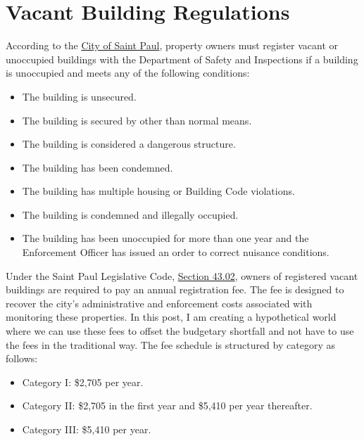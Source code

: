 \documentclass[12pt]{article}
\begin{document}
\section*{Vacant Building Regulations}

According to the \href{https://www.stpaul.gov/departments/safety-inspections/rent-buy-sell-property/vacant-buildings/vacant-building-program}{City of Saint Paul}, property owners must register vacant or unoccupied buildings with the Department of Safety and Inspections if a building is unoccupied and meets any of the following conditions:

\begin{itemize}
    \item The building is unsecured.
    \item The building is secured by other than normal means.
    \item The building is considered a dangerous structure.
    \item The building has been condemned.
    \item The building has multiple housing or Building Code violations.
    \item The building is condemned and illegally occupied.
    \item The building has been unoccupied for more than one year and the Enforcement Officer has issued an order to correct nuisance conditions.
\end{itemize}


Under the Saint Paul Legislative Code, \href{https://library.municode.com/mn/st._paul/codes/code_of_ordinances?nodeId=PTIILECO_TITVIBUHO_CH43VABU_S43.03VABURE}{Section 43.02}, owners of registered vacant buildings are required to pay an annual registration fee. The fee is designed to recover the city’s administrative and enforcement costs associated with monitoring these properties. In this post, I am creating a hypothetical world where we can use these fees to offset the budgetary shortfall and not have to use the fees in the traditional way. The fee schedule is structured by category as follows:

\begin{itemize}
    \item Category I: \$2,705 per year.
    \item Category II: \$2,705 in the first year and \$5,410 per year thereafter.
    \item Category III: \$5,410 per year.
\end{itemize}
\end{document}
